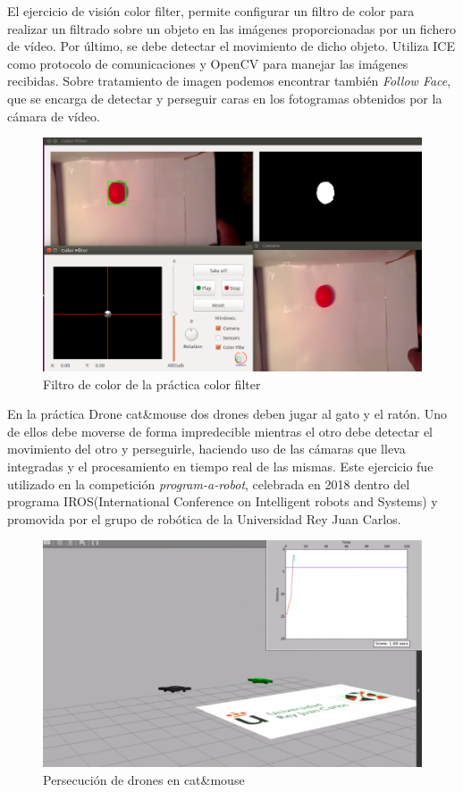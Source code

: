 \documentclass[12pt,spanish,chapterprefix, numbers=noenddot]{book}
\numberwithin{equation}{section}
\numberwithin{figure}{section}
\begin{document}
El ejercicio de visión color filter, permite configurar un filtro  de color para realizar un filtrado sobre un objeto en las imágenes proporcionadas por un fichero de vídeo. Por último, se debe detectar el movimiento de dicho objeto. Utiliza ICE como protocolo de comunicaciones y OpenCV para manejar las imágenes recibidas. 
Sobre tratamiento de imagen podemos encontrar también \textit{Follow Face}, que se encarga de detectar y perseguir caras en los fotogramas obtenidos por la cámara de vídeo\cite{Carlos}. 

\begin{figure}[hbt!]
\centering
\includegraphics[width=12cm]{Figs/colorFilter.png}
\par
\caption{\label{fig:colorFilter}Filtro de color de la práctica color filter}
\end{figure}

En la práctica Drone cat\&mouse dos drones deben jugar al gato y el ratón. Uno de ellos debe moverse de forma impredecible mientras el otro debe detectar el movimiento del otro y perseguirle, haciendo uso de las cámaras que lleva integradas y el procesamiento en tiempo real de las mismas. Este ejercicio fue utilizado en la competición \textit{program-a-robot}, celebrada en 2018 dentro del programa IROS(International Conference on Intelligent robots and Systems) y promovida por el grupo de robótica de la Universidad Rey Juan Carlos.

\begin{figure}[hbt!]
\centering
\includegraphics[width=12cm]{Figs/catMouse.png}
\par
\caption{\label{fig:catMouse}Persecución de drones en cat\&mouse}
\end{figure}
\end{document}
